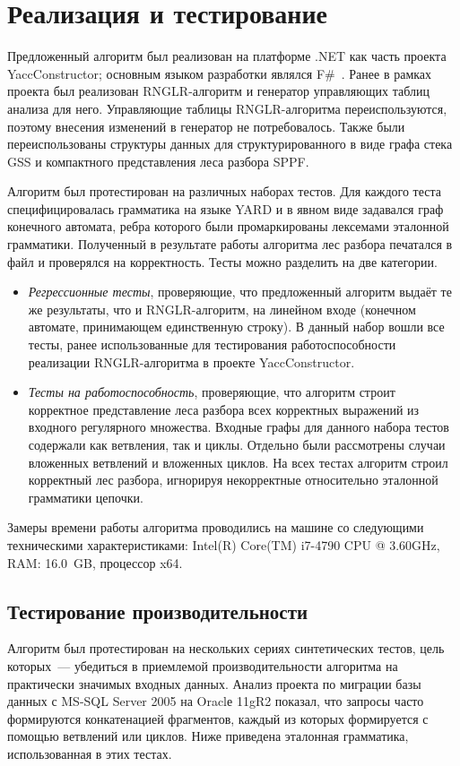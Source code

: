 \section{Реализация и тестирование}
Предложенный алгоритм был реализован на платформе .NET как часть проекта YaccConstructor; основным языком разработки являлся F\#~\cite{FSharp}. Ранее в рамках проекта был реализован RNGLR-алгоритм и генератор управляющих таблиц анализа для него. Управляющие таблицы RNGLR-алгоритма переиспользуются, поэтому внесения изменений в генератор не потребовалось. Также были переиспользованы структуры данных для структурированного в виде графа стека GSS и компактного представления леса разбора SPPF. 

Алгоритм был протестирован на различных наборах тестов. Для каждого теста специфицировалась грамматика на языке YARD и в явном виде задавался граф конечного автомата, ребра которого были промаркированы лексемами эталонной грамматики. Полученный в результате работы алгоритма лес разбора печатался в файл и проверялся на корректность. Тесты можно разделить на две категории.
\begin{itemize}
  \item \emph{Регрессионные тесты}, проверяющие, что предложенный алгоритм выдаёт те же результаты, что и RNGLR-алгоритм, на линейном входе (конечном автомате, принимающем единственную строку). В данный набор вошли все тесты, ранее использованные для тестирования работоспособности реализации RNGLR-алгоритма в проекте YaccConstructor. 
  \item \emph{Тесты на работоспособность}, проверяющие, что алгоритм строит корректное представление леса разбора всех корректных выражений из входного регулярного множества. Входные графы для данного набора тестов содержали как ветвления, так и циклы. Отдельно были рассмотрены случаи вложенных ветвлений и вложенных циклов. На всех тестах алгоритм строил корректный лес разбора, игнорируя некорректные относительно эталонной грамматики цепочки.
\end{itemize}

Замеры времени работы алгоритма проводились на машине со следующими техническими характеристиками: Intel(R) Core(TM) i7-4790 CPU @ 3.60GHz, RAM: 16.0~GB, процессор x64.

\subsection{Тестирование производительности}
Алгоритм был протестирован на нескольких сериях синтетических тестов, цель которых~--- убедиться в приемлемой производительности алгоритма на практически значимых входных данных. Анализ проекта по миграции базы данных с MS-SQL Server 2005 на Oraclе 11gR2 показал, что запросы часто формируются конкатенацией фрагментов, каждый из которых формируется с помощью ветвлений или циклов. Ниже приведена эталонная грамматика, использованная в этих тестах. 

